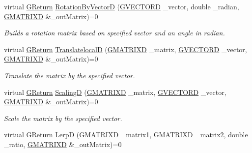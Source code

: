 \begin{DoxyCompactItemize}
virtual \mbox{\hyperlink{namespace_g_w_a67a839e3df7ea8a5c5686613a7a3de21}{G\+Return}} \mbox{\hyperlink{class_g_w_1_1_m_a_t_h_1_1_g_matrix_a7262ab71d767293693314c60076652fe}{Rotation\+By\+VectorD}} (\mbox{\hyperlink{struct_g_w_1_1_m_a_t_h_1_1_g_v_e_c_t_o_r_d}{G\+V\+E\+C\+T\+O\+RD}} \+\_\+vector, double \+\_\+radian, \mbox{\hyperlink{struct_g_w_1_1_m_a_t_h_1_1_g_m_a_t_r_i_x_d}{G\+M\+A\+T\+R\+I\+XD}} \&\+\_\+out\+Matrix)=0
\begin{DoxyCompactList}\small\item\em Builds a rotation matrix based on specified vector and an angle in radian. \end{DoxyCompactList}\item 
virtual \mbox{\hyperlink{namespace_g_w_a67a839e3df7ea8a5c5686613a7a3de21}{G\+Return}} \mbox{\hyperlink{class_g_w_1_1_m_a_t_h_1_1_g_matrix_a03adfd30119a70006679ee98a320591a}{TranslatelocalD}} (\mbox{\hyperlink{struct_g_w_1_1_m_a_t_h_1_1_g_m_a_t_r_i_x_d}{G\+M\+A\+T\+R\+I\+XD}} \+\_\+matrix, \mbox{\hyperlink{struct_g_w_1_1_m_a_t_h_1_1_g_v_e_c_t_o_r_d}{G\+V\+E\+C\+T\+O\+RD}} \+\_\+vector, \mbox{\hyperlink{struct_g_w_1_1_m_a_t_h_1_1_g_m_a_t_r_i_x_d}{G\+M\+A\+T\+R\+I\+XD}} \&\+\_\+out\+Matrix)=0
\begin{DoxyCompactList}\small\item\em Translate the matrix by the specified vector. \end{DoxyCompactList}\item 
virtual \mbox{\hyperlink{namespace_g_w_a67a839e3df7ea8a5c5686613a7a3de21}{G\+Return}} \mbox{\hyperlink{class_g_w_1_1_m_a_t_h_1_1_g_matrix_adcfdcd010361f3de14661e7d8a54a1dc}{ScalingD}} (\mbox{\hyperlink{struct_g_w_1_1_m_a_t_h_1_1_g_m_a_t_r_i_x_d}{G\+M\+A\+T\+R\+I\+XD}} \+\_\+matrix, \mbox{\hyperlink{struct_g_w_1_1_m_a_t_h_1_1_g_v_e_c_t_o_r_d}{G\+V\+E\+C\+T\+O\+RD}} \+\_\+vector, \mbox{\hyperlink{struct_g_w_1_1_m_a_t_h_1_1_g_m_a_t_r_i_x_d}{G\+M\+A\+T\+R\+I\+XD}} \&\+\_\+out\+Matrix)=0
\begin{DoxyCompactList}\small\item\em Scale the matrix by the specified vector. \end{DoxyCompactList}\item 
virtual \mbox{\hyperlink{namespace_g_w_a67a839e3df7ea8a5c5686613a7a3de21}{G\+Return}} \mbox{\hyperlink{class_g_w_1_1_m_a_t_h_1_1_g_matrix_ad53d4038a37cafb207bda974d80009d5}{LerpD}} (\mbox{\hyperlink{struct_g_w_1_1_m_a_t_h_1_1_g_m_a_t_r_i_x_d}{G\+M\+A\+T\+R\+I\+XD}} \+\_\+matrix1, \mbox{\hyperlink{struct_g_w_1_1_m_a_t_h_1_1_g_m_a_t_r_i_x_d}{G\+M\+A\+T\+R\+I\+XD}} \+\_\+matrix2, double \+\_\+ratio, \mbox{\hyperlink{struct_g_w_1_1_m_a_t_h_1_1_g_m_a_t_r_i_x_d}{G\+M\+A\+T\+R\+I\+XD}} \&\+\_\+out\+Matrix)=0

\end{DoxyCompactItemize}
